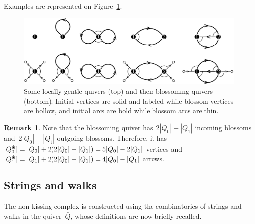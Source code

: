\documentclass{amsart}
\theoremstyle{definition}
\newtheorem{remark}[theorem]{Remark}
\newcommand{\fref}[1]{Figure~\ref{#1}} %
\newcommand{\blossom}{^\text{\ding{96}}} %
\begin{document}
Examples are represented on \fref{fig:quivers}.

\begin{figure}[t]
	\capstart
	\centerline{\includegraphics[scale=.6]{quivers}}
	\caption{Some locally gentle quivers (top) and their blossoming quivers (bottom). Initial vertices are solid and labeled while blossom vertices are hollow, and initial arcs are bold while blossom arcs are thin.}
	\label{fig:quivers}
\end{figure}

\begin{remark}
\label{rem:sizeBlossomingQuiver}
Note that the blossoming quiver has~$2|Q_0|-|Q_1|$ incoming blossoms and~$2|Q_0|-|Q_1|$ outgoing blossoms.
Therefore, it has $|Q_0\blossom| = |Q_0| + 2(2|Q_0|-|Q_1|) = 5|Q_0|-2|Q_1|$ vertices and~$|Q_1\blossom| = |Q_1| + 2(2|Q_0|-|Q_1|) = 4|Q_0|-|Q_1|$ arrows.
\end{remark}

\subsection{Strings and walks}

The non-kissing complex is constructed using the combinatorics of strings and walks in the quiver~$\bar Q$, whose definitions are now briefly recalled.
\end{document}
